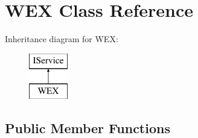 \hypertarget{class_w_e_x}{}\section{W\+EX Class Reference}
\label{class_w_e_x}
Inheritance diagram for W\+EX\+:\begin{figure}[H]
\begin{center}
\leavevmode
\includegraphics[height=2.000000cm]{class_w_e_x}
\end{center}
\end{figure}
\subsection*{Public Member Functions}
